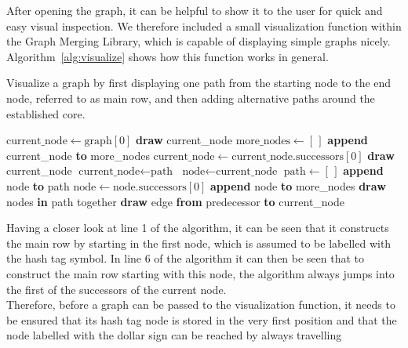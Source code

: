 \documentclass[a4paper,12pt,twoside,BCOR=10mm]{scrbook}
\begin{document}
After opening the graph, it can be helpful to show it to the user for 
quick and easy visual inspection. 
We therefore included a small visualization function within the Graph Merging Library, 
which is capable of displaying simple graphs nicely. 
Algorithm~\ref{alg:visualize} shows how this function works in general. 
\begin{algorithm}
\caption[Visualize a graph]{Visualize a graph by first displaying one path from 
the starting node to the end node, referred to as main row, 
and then adding alternative paths around the established core.}
\label{alg:visualize}
\begin{algorithmic}[1]
\State $ \textrm{current\_node} \gets \textrm{graph}[0] $
\State \textbf{draw} current\_node
\State $ \textrm{more\_nodes} \gets [ \, ] $
	\State \textbf{append} current\_node \textbf{to} more\_nodes
	\State $ \textrm{current\_node} \gets \textrm{current\_node.successors}[0] $
	\State \textbf{draw} current\_node
\EndWhile
\State \phantom{emptyline}
	\State $ \textrm{current\_node} \gets \textrm{path} $
		\State $ \textrm{node} \gets \textrm{current\_node} $
		\State $ \textrm{path} \gets [ \, ] $
			\State \textbf{append} node \textbf{to} path
			\State $ \textrm{node} \gets \textrm{node.successors}[0] $
				\State \textbf{append} node \textbf{to} more\_nodes
			\EndIf
		\EndWhile
		\State \textbf{draw} nodes \textbf{in} path together
	\EndIf
		\State \textbf{draw} edge \textbf{from} predecessor \textbf{to} current\_node
	\EndFor
\EndFor
\end{algorithmic}
\end{algorithm}
Having a closer look at line 1 of the algorithm, 
it can be seen that it constructs the main row 
by starting in the first node, which is assumed to 
be labelled with the hash tag symbol. 
In line 6 of the algorithm it can then be seen 
that to construct the main row starting with this node, 
the algorithm always jumps into the first of the successors of the current node. \\
Therefore, before a graph can be passed to the visualization function, 
it needs to be ensured that its hash tag node is stored in the very first position 
and that the node labelled with the dollar sign can be reached by always travelling 
\end{document}
